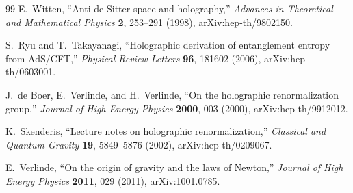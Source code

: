 \documentclass[11pt]{article}
\begin{document}
\begin{thebibliography}{99}
E.~Witten,
``Anti de Sitter space and holography,''
\textit{Advances in Theoretical and Mathematical Physics} \textbf{2},
253--291 (1998), arXiv:hep-th/9802150.

S.~Ryu and T.~Takayanagi,
``Holographic derivation of entanglement entropy from AdS/CFT,''
\textit{Physical Review Letters} \textbf{96}, 181602 (2006),
arXiv:hep-th/0603001.

J.~de Boer, E.~Verlinde, and H.~Verlinde,
``On the holographic renormalization group,''
\textit{Journal of High Energy Physics} \textbf{2000}, 003 (2000),
arXiv:hep-th/9912012.

K.~Skenderis,
``Lecture notes on holographic renormalization,''
\textit{Classical and Quantum Gravity} \textbf{19}, 5849--5876 (2002),
arXiv:hep-th/0209067.

E.~Verlinde,
``On the origin of gravity and the laws of Newton,''
\textit{Journal of High Energy Physics} \textbf{2011}, 029 (2011),
arXiv:1001.0785.

\end{thebibliography}
\end{document}
